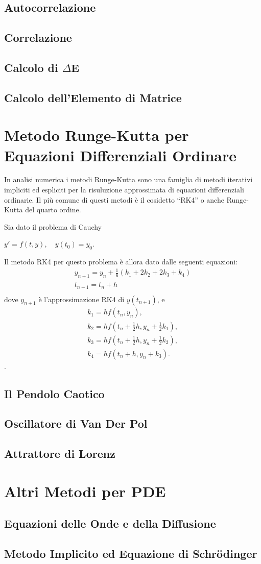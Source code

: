 \documentclass[a4paper,11pt]{report}
\begin{document}
\section{Autocorrelazione}
\section{Correlazione}
\section{Calcolo di $\Delta$E}
\section{Calcolo dell'Elemento di Matrice}

\chapter{\huge Metodo Runge-Kutta per Equazioni Differenziali Ordinare}
In analisi numerica i metodi Runge-Kutta sono una famiglia di metodi iterativi impliciti ed espliciti per la risuluzione approssimata di equazioni differenziali ordinarie. Il più comune di questi metodi è il cosidetto ``RK4'' o anche Runge-Kutta del quarto ordine.

Sia dato il problema di Cauchy
\begin{center}
$ y' = f(t, y), \quad y(t_0) = y_0.$
\end{center}
Il metodo RK4 per questo problema è allora dato dalle seguenti equazioni:
\begin{align}y_{n+1} = y_n + \tfrac{1}{6} \left(k_1 + 2k_2 + 2k_3 + k_4 \right) \\t_{n+1} = t_n + h \\\end{align}
dove $y_{n+1}$ è l'approssimazione RK4 di $y(t_{n+1})$, e
\begin{align}k_1 = hf(t_n, y_n),\\k_2 = hf(t_n + \tfrac{1}{2}h , y_n +  \tfrac{1}{2} k_1),\\k_3 = hf(t_n + \tfrac{1}{2}h , y_n +   \tfrac{1}{2} k_2),\\k_4 = hf(t_n + h , y_n + k_3).\end{align}.

\section{Il Pendolo Caotico}
\section{Oscillatore di Van Der Pol}
\section{Attrattore di Lorenz}

\chapter{\huge Altri Metodi per PDE}

\section{Equazioni delle Onde e della Diffusione}
\section{Metodo Implicito ed Equazione di Schr\"{o}dinger}
\end{document}
